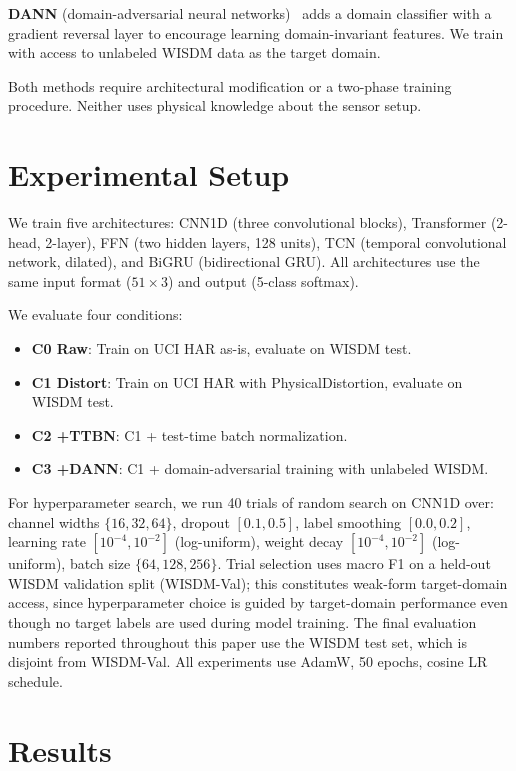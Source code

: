 \documentclass[12pt]{article}
\begin{document}
\textbf{DANN} (domain-adversarial neural networks)~\citep{ganin2016domain} adds a domain classifier with a gradient reversal layer to encourage learning domain-invariant features. We train with access to unlabeled WISDM data as the target domain.

Both methods require architectural modification or a two-phase training procedure. Neither uses physical knowledge about the sensor setup.

\section{Experimental Setup}

We train five architectures: CNN1D (three convolutional blocks), Transformer (2-head, 2-layer), FFN (two hidden layers, 128 units), TCN (temporal convolutional network, dilated), and BiGRU (bidirectional GRU). All architectures use the same input format ($51 \times 3$) and output (5-class softmax).

We evaluate four conditions:
\begin{itemize}
    \item \textbf{C0 Raw}: Train on UCI HAR as-is, evaluate on WISDM test.
    \item \textbf{C1 Distort}: Train on UCI HAR with PhysicalDistortion, evaluate on WISDM test.
    \item \textbf{C2 +TTBN}: C1 + test-time batch normalization.
    \item \textbf{C3 +DANN}: C1 + domain-adversarial training with unlabeled WISDM.
\end{itemize}

For hyperparameter search, we run 40 trials of random search on CNN1D over: channel widths $\{16, 32, 64\}$, dropout $[0.1, 0.5]$, label smoothing $[0.0, 0.2]$, learning rate $[10^{-4}, 10^{-2}]$ (log-uniform), weight decay $[10^{-4}, 10^{-2}]$ (log-uniform), batch size $\{64, 128, 256\}$. Trial selection uses macro F1 on a held-out WISDM validation split (WISDM-Val); this constitutes weak-form target-domain access, since hyperparameter choice is guided by target-domain performance even though no target labels are used during model training. The final evaluation numbers reported throughout this paper use the WISDM test set, which is disjoint from WISDM-Val. All experiments use AdamW, 50 epochs, cosine LR schedule.

\section{Results}
\end{document}
